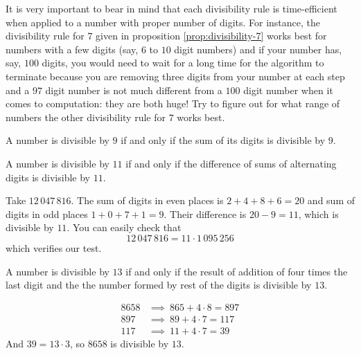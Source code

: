 It is very important to bear in mind that each divisibility rule is time-efficient when applied to a number with proper number of digits. For instance, the divisibility rule for $7$ given in proposition \eqref{prop:divisibility-7} works best for numbers with a few digits (say, $6$ to $10$ digit numbers) and if your number has, say, $100$ digits, you would need to wait for a long time for the algorithm to terminate because you are removing three digits from your number at each step and a $97$ digit number is not much different from a $100$ digit number when it comes to computation: they are both huge! Try to figure out for what range of numbers the other divisibility rule for $7$ works best.

\begin{proposition}[Divisibility by $9$]
	A number is divisible by $9$ if and only if the sum of its digits is divisible by $9$.
\end{proposition}

\begin{proposition}[Divisibility by $11$]
	A number is divisible by $11$ if and only if the difference of sums of alternating digits is divisible by $11$.
\end{proposition}

\begin{example}
	Take $12 \, 047 \, 816$. The sum of digits in even places is $2+4+8+6=20$ and sum of digits in odd places $1+0+7+1=9$. Their difference is $20-9=11$, which is divisible by $11$. You can easily check that $$12 \, 047 \, 816=11\cdot1 \,095\, 256$$ which verifies our test.
\end{example}

\begin{proposition}[Divisibility by $13$]
	A number is divisible by $13$ if and only if the result of addition of four times the last digit and the the number formed by rest of the digits is divisible by $13$.
\end{proposition}

\begin{example}
	\begin{align*}
		8658 & \implies \ 865 + 4 \cdot 8 = 897 \\
		897 & \implies  \ 89 + 4 \cdot 7 =   117 \\
		117 & \implies \ 11 + 4 \cdot 7 =  39
	\end{align*}
	And $39 = 13 \cdot 3$, so $8658$ is divisible by $13$.
\end{example}


